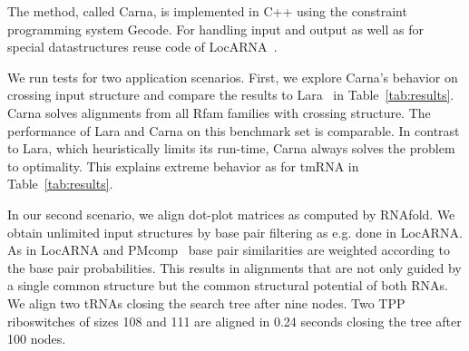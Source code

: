 \documentclass[11pt]{llncs}
\begin{document}
The method, called Carna, is implemented in C++ using the constraint
programming system Gecode. For handling input and output as well as
for special datastructures reuse code of
LocARNA~\cite{Will:etal:_infer_non_codin_rna_famil:PLOS2007}.

We run tests for two application scenarios. First, we explore Carna's
behavior on crossing input structure and compare the results to
Lara~\cite{Bauer:Klau:Reinert:Accur_multi_seque:2007} in
Table~\ref{tab:results}. Carna solves alignments from all Rfam
families with crossing structure. The performance of Lara and Carna on
this benchmark set is comparable. In contrast to Lara, which
heuristically limits its run-time, Carna always solves the problem to
optimality. This explains extreme behavior as for tmRNA in
Table~\ref{tab:results}.

In our second scenario, we align dot-plot matrices as computed by
RNAfold\cite{Hofacker:Fontana:Stadler:Bonhoeffer:Tacker:Schuster:MonChem1994}. We
obtain unlimited input structures by base pair filtering as e.g. done
in LocARNA. As in LocARNA and
PMcomp~\cite{Hofacker:Bernhart:Stadler:Align_RNA_base:2004} base pair
similarities are weighted according to the base pair
probabilities. This results in alignments that are not only guided by
a single common structure but the common structural potential of both
RNAs. We align two tRNAs closing the search tree after nine nodes. Two
TPP riboswitches of sizes 108 and 111 are aligned in 0.24 seconds
closing the tree after 100 nodes.
\end{document}
